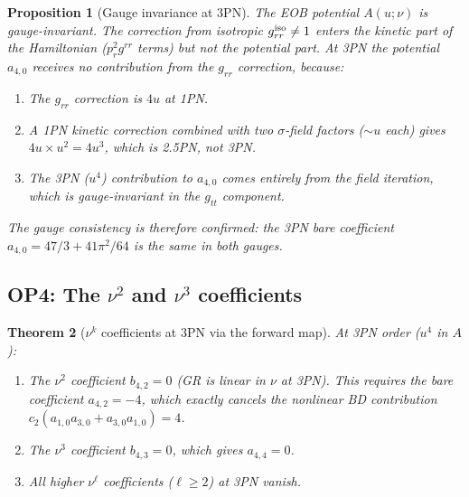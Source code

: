 \documentclass[11pt,a4paper]{article}
\theoremstyle{plain}
\newtheorem{theorem}{Theorem}[section]
\newtheorem{proposition}[theorem]{Proposition}
\theoremstyle{definition}
\theoremstyle{remark}
\begin{document}
\begin{proposition}[Gauge invariance at 3PN]
\label{prop:gauge}
The EOB potential $A(u;\nu)$ is gauge-invariant.  The correction from isotropic
$g_{rr}^{\rm iso} \neq 1$ enters the kinetic part of the Hamiltonian
($p_r^2 g^{rr}$ terms) but not the potential part.  At 3PN the potential
$a_{4,0}$ receives no contribution from the $g_{rr}$ correction, because:
\begin{enumerate}[nosep,label=\rm(\roman*)]
  \item The $g_{rr}$ correction is $4u$ at 1PN.
  \item A 1PN kinetic correction combined with two $\sigma$-field factors
    ($\sim u$ each) gives $4u \times u^2 = 4u^3$, which is 2.5PN, not 3PN.
  \item The 3PN ($u^4$) contribution to $a_{4,0}$ comes entirely from the
    field iteration, which is gauge-invariant in the $g_{tt}$ component.
\end{enumerate}
The gauge consistency is therefore confirmed: the 3PN bare coefficient
$a_{4,0} = 47/3 + 41\pi^2/64$ is the same in both gauges.
\end{proposition}

\subsection{OP4: The $\nu^2$ and $\nu^3$ coefficients}

\begin{theorem}[$\nu^k$ coefficients at 3PN via the forward map]
\label{thm:nu_higher}
At 3PN order ($u^4$ in $A$):
\begin{enumerate}[nosep,label=\rm(\roman*)]
  \item The $\nu^2$ coefficient $b_{4,2} = 0$ (GR is linear in $\nu$ at 3PN).
    This requires the bare coefficient $a_{4,2} = -4$, which exactly cancels
    the nonlinear BD contribution $c_2(a_{1,0}a_{3,0} + a_{3,0}a_{1,0}) = 4$.
  \item The $\nu^3$ coefficient $b_{4,3} = 0$, which gives $a_{4,4} = 0$.
  \item All higher $\nu^\ell$ coefficients ($\ell \geq 2$) at 3PN vanish.
\end{enumerate}
\end{theorem}
\end{document}
